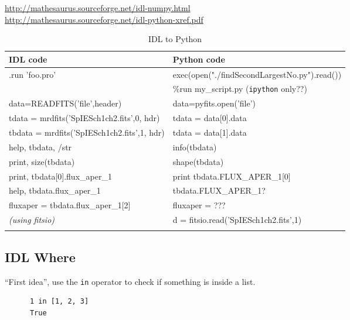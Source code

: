\documentclass[11pt,a4paper]{article}
\begin{document}
\href{http://mathesaurus.sourceforge.net/idl-numpy.html}{http://mathesaurus.sourceforge.net/idl-numpy.html}\\

\href{http://mathesaurus.sourceforge.net/idl-python-xref.pdf}{http://mathesaurus.sourceforge.net/idl-python-xref.pdf}\\

\begin{table}
  \begin{center}
    \setlength{\tabcolsep}{4pt}
    \begin{tabular}{ll}
      \hline\hline
      IDL code   & Python code \\
      \hline 
      .run 'foo.pro'  & exec(open("./findSecondLargestNo.py").read())\\
                            & \%run my\_script.py  ({\tt ipython} only??)\\
      \hline
      data=READFITS('file',header) 	 & data=pyfits.open('file')\\
      tdata  = mrdfits('SpIESch1ch2.fits',0, hdr) 	 & tdata = data[0].data \\
      tbdata = mrdfits('SpIESch1ch2.fits',1, hdr) 	 & tdata = data[1].data \\
      help, tbdata, /str     & info(tbdata)\\
      print, size(tbdata)  & shape(tbdata)\\
      print, tbdata[0].flux\_aper\_1 & print tbdata.FLUX\_APER\_1[0]\\
      help, tbdata.flux\_aper\_1        & tbdata.FLUX\_APER\_1? \\
      fluxaper = tbdata.flux\_aper\_1[2] & fluxaper = ??? \\
      \hline 
     {\it (using fitsio)} & d = fitsio.read('SpIESch1ch2.fits',1) \\
      \hline
      \label{tab:IDL2Python}
    \end{tabular}
    \caption{IDL to Python}
    \label{table:idl_vs_python}
  \end{center}
\end{table}


    \subsection{IDL Where}
    ``First idea'', use the {\tt in} operator to check if something is inside a list.
    \begin{lstlisting}
      1 in [1, 2, 3]
      True
     \end{lstlisting}
\end{document}
